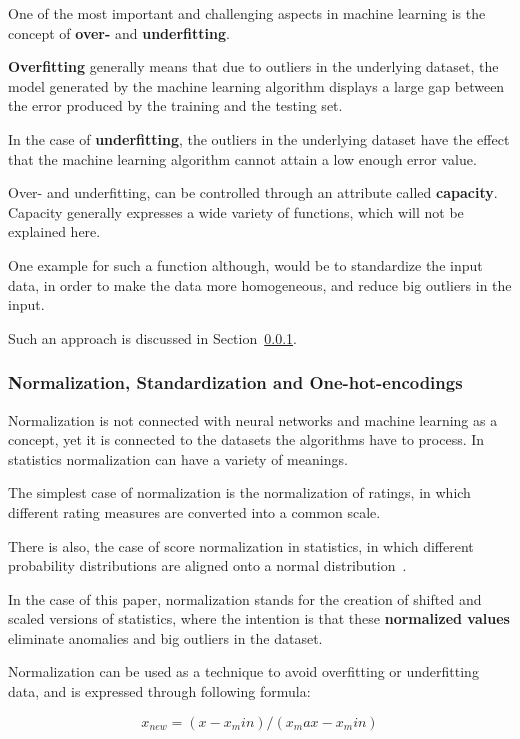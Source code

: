 \documentclass[12pt]{article}
\begin{document}
One of the most important and challenging aspects in machine learning is the concept of \textbf{over-} and \textbf{underfitting}. 

\textbf{Overfitting} generally means that due to outliers in the underlying dataset, the model generated by the machine learning algorithm displays a large gap between the error produced by the training and the testing set.

In the case of \textbf{underfitting}, the outliers in the underlying dataset have the effect that the machine learning algorithm cannot attain a low enough error value.

Over- and underfitting, can be controlled through an attribute called \textbf{capacity}. Capacity generally expresses a wide variety of functions, which will not be explained here. 

One example for such a function although, would be to standardize the input data, in order to make the data more homogeneous, and reduce big outliers in the input. 

Such an approach is discussed in Section~\ref{subsub:norm_stand_one_hot}.

\subsubsection{Normalization, Standardization and One-hot-encodings}
\label{subsub:norm_stand_one_hot}

Normalization is not connected with neural networks and machine learning as a concept, yet it is connected to the datasets the algorithms have to process. In statistics normalization can have a variety of meanings. 

The simplest case of normalization is the normalization of ratings, in which different rating measures are converted into a common scale. 

There is also, the case of score normalization in statistics, in which different probability distributions are aligned onto a normal distribution~\citep{normal}.

In the case of this paper, normalization stands for the creation of shifted and scaled versions of statistics, where the intention is that these \textbf{normalized values} eliminate anomalies and big outliers in the dataset. 

Normalization can be used as a technique to avoid overfitting or underfitting data, and is expressed through following formula:

\begin{equation}
x_{new} = (x - x_min)/(x_max - x_min)
\end{equation}
\end{document}
